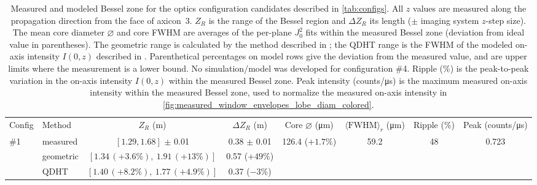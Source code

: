 \documentclass[
  aps,
  twocolumn,
  reprint,              %
  superscriptaddress,
  amsmath,
  amssymb,
  floatfix,
  longbibliography,      %
  nofootinbib %
]{revtex4-2}
\begin{document}
\begin{table}
  \caption{Measured and modeled Bessel zone for the optics configuration
    candidates described in \autoref{tab:configs}. All $z$ values are
    measured along the propagation direction from the face of axicon~3.
    $Z_R$ is the range of the Bessel region and $\Delta Z_R$ its length
    ($\pm$ imaging system $z$-step size). The mean core diameter $\varnothing$ and core
    FWHM are averages of the per-plane $J_0^2$ fits within the measured
    Bessel zone (deviation from ideal value in parentheses). The geometric
    range is calculated by the method described in ; the QDHT range is
    the FWHM of the modeled on-axis intensity $I(0,z)$ described in .
    Parenthetical percentages on model rows give the deviation from the
    measured value, and are upper limits where the measurement is a lower
    bound. No simulation/model was developed for configuration \#4. Ripple (\%) is the peak-to-peak variation in the on-axis intensity $I(0,z)$ within the measured Bessel zone. Peak intensity (counts/\si{\micro\second}) is the maximum measured on-axis intensity within the measured Bessel zone, used to normalize the measured on-axis intensity in \autoref{fig:measured_window_envelopes_lobe_diam_colored}.
    \label{tab:results_summary}}
  \begin{ruledtabular}
    \begin{tabular}{llcccccc}
      Config & Method    & $Z_R$ (m)                               & $\Delta Z_R$ (m)    & Core $\varnothing$ (\si{\micro\meter}) & $\langle \mathrm{FWHM} \rangle_r$ (\si{\micro\meter}) & Ripple (\%) & Peak (counts/\si{\micro\second}) \\
      \colrule
      \#1    & measured  & $[1.29, 1.68]$   $\pm$ 0.01             & 0.38 $\pm$ 0.01     & 126.4 ($+1.7\%$)                       & 59.2                                                  & 48          & 0.723                            \\
             & geometric & $[1.34\,(+3.6\%),\ 1.91\,(+13\%)]$      & 0.57 ($+49\%$)      &                                        &                                                       &             &                                  \\
             & QDHT      & $[1.40\,(+8.2\%),\ 1.77\,(+4.9\%)]$     & 0.37 ($-3\%$)       &                                        &                                                       &             &                                  \\ \hline

\end{tabular}
\end{ruledtabular}
\end{table}
\end{document}
